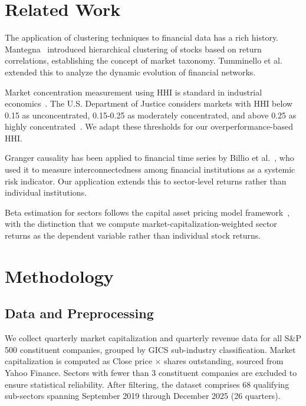 \documentclass[11pt]{article}
\begin{document}
\section{Related Work}

The application of clustering techniques to financial data has a rich history. Mantegna~\cite{mantegna1999} introduced hierarchical clustering of stocks based on return correlations, establishing the concept of market taxonomy. Tumminello et al.~\cite{tumminello2010} extended this to analyze the dynamic evolution of financial networks.

Market concentration measurement using HHI is standard in industrial economics~\cite{rhoades1993}. The U.S. Department of Justice considers markets with HHI below 0.15 as unconcentrated, 0.15-0.25 as moderately concentrated, and above 0.25 as highly concentrated~\cite{doj2010}. We adapt these thresholds for our overperformance-based HHI.

Granger causality has been applied to financial time series by Billio et al.~\cite{billio2012}, who used it to measure interconnectedness among financial institutions as a systemic risk indicator. Our application extends this to sector-level returns rather than individual institutions.

Beta estimation for sectors follows the capital asset pricing model framework~\cite{sharpe1964}, with the distinction that we compute market-capitalization-weighted sector returns as the dependent variable rather than individual stock returns.

\section{Methodology}

\subsection{Data and Preprocessing}

We collect quarterly market capitalization and quarterly revenue data for all S\&P 500 constituent companies, grouped by GICS sub-industry classification. Market capitalization is computed as Close price $\times$ shares outstanding, sourced from Yahoo Finance. Sectors with fewer than 3 constituent companies are excluded to ensure statistical reliability. After filtering, the dataset comprises 68 qualifying sub-sectors spanning September 2019 through December 2025 (26 quarters).
\end{document}
